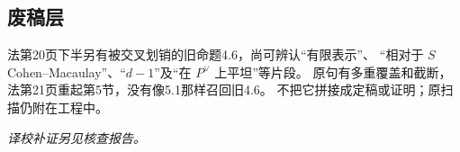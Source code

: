 \subsection*{废稿层}
法第20页下半另有被交叉划销的旧命题4.6，尚可辨认“有限表示”、
“相对于 $S$ Cohen--Macaulay”、“$d-1$”及“在 $P^\vee$ 上平坦”等片段。
原句有多重覆盖和截断，法第21页重起第5节，没有像5.1那样召回旧4.6。
不把它拼接成定稿或证明；原扫描仍附在工程中。

\par\noindent\textit{译校补证另见核查报告。}

\endgroup
